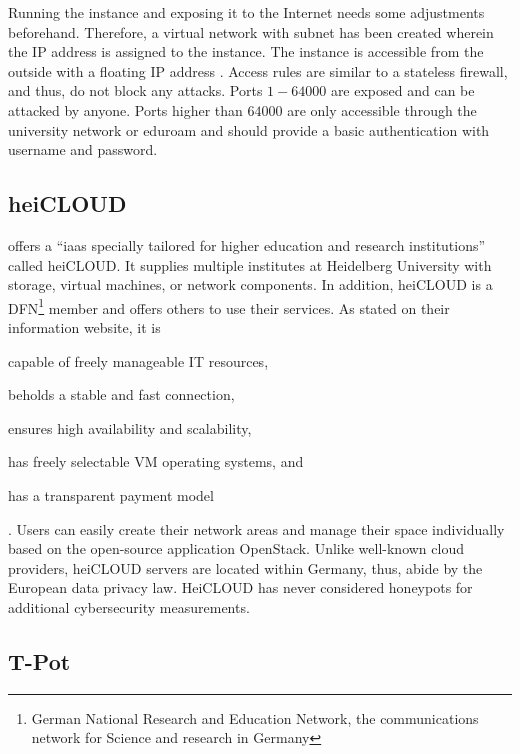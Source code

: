 Running the instance and exposing it to the Internet needs some adjustments beforehand.
Therefore, a virtual network with subnet  has been created wherein the IP address  is assigned to the instance.
The instance is accessible from the outside with a floating IP address .
Access rules are similar to a stateless firewall, and thus, do not block any attacks.
Ports $1-64000$ are exposed and can be attacked by anyone.
Ports higher than $64000$ are only accessible through the university network  or eduroam  and should provide a basic authentication with username and password.

\subsection{heiCLOUD}
\label{subsec:heicloud}

\citet{urz2021} offers a \enquote{\ac{iaas} specially tailored for higher education and research institutions} called heiCLOUD.
It supplies multiple institutes at Heidelberg University with storage, virtual machines, or network components.
In addition, heiCLOUD is a DFN\footnote{German National Research and Education Network, the communications network for Science and research in Germany} member and offers others to use their services.
As stated on their information website\cite{heicloud2021}, it is
\begin{enumerate*}[label=(\roman*)]
    \item capable of freely manageable IT resources,
    \item beholds a stable and fast connection,
    \item ensures high availability and scalability,
    \item has freely selectable VM operating systems, and
    \item has a transparent payment model
\end{enumerate*} \cite{heicloud2021}.
Users can easily create their network areas and manage their space individually based on the open-source application OpenStack.
Unlike well-known cloud providers, heiCLOUD servers are located within Germany, thus, abide by the European data privacy law.
HeiCLOUD has never considered honeypots for additional cybersecurity measurements.

\subsection{T-Pot}
\label{subsec:tpot}

